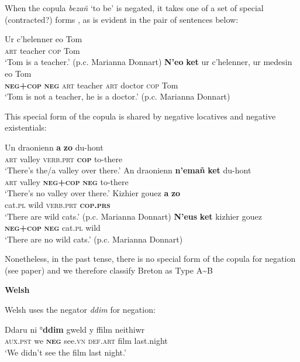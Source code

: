 \documentclass[output=paper]{langsci/langscibook}
\begin{document}
\begin{unindented}
When the copula \textit{bezañ} `to be' \citep[144]{Press1986} is negated, it takes one of a set of special (contracted?) forms \citep[152]{Press1986}, as is evident in the pair of sentences below:
%
\begin{exe}\ex \gll Ur   c’helenner eo    Tom \\
\textsc{art} teacher \textsc{cop} Tom \\
    \glt `Tom is a teacher.' (p.c. Marianna Donnart)
\ex \gll \textbf{N’eo} \textbf{ket} ur c’helenner, ur medesin eo Tom \\
\textbf{\textsc{neg+cop}} \textbf{\textsc{neg}} \textsc{art} teacher        \textsc{art} doctor    \textsc{cop} Tom \\
    \glt `Tom is not a teacher, he is a doctor.' (p.c. Marianna Donnart)
    \end{exe}

This special form of the copula is shared by negative locatives and negative existentials:
%
\begin{exe}\ex \gll Un  draonienn \textbf{a} \textbf{zo}   du-hont \\
\textsc{art} valley \textsc{verb.prt} \textbf{\textsc{cop}} to-there \\
    \glt `There's the/a valley over there.' \citep[154]{Press1986}
\ex \gll
An   draonienn \textbf{n’emañ}     \textbf{ket}  du-hont \\
\textsc{art} valley \textbf{\textsc{neg+cop}} \textbf{\textsc{neg}} to-there \\
    \glt `There's no valley over there.' \citep[155]{Press1986}
\ex \gll Kizhier gouez \textbf{a} \textbf{zo} \\
cat.\textsc{pl}   wild   \textsc{verb.prt} \textbf{\textsc{cop.prs}} \\
    \glt `There are wild cats.' (p.c. Marianna Donnart)
\ex \gll \textbf{N’eus} \textbf{ket}   kizhier gouez \\
\textbf{\textsc{neg+cop}} \textbf{\textsc{neg}} cat.\textsc{pl} wild \\
    \glt `There are no wild cats.' (p.c. Marianna Donnart)
    \end{exe}

Nonetheless, in the past tense, there is no special form of the copula for negation (see paper) and we therefore classify Breton as Type A{\textasciitilde}B

\textbf{Welsh}

Welsh uses the negator \textit{ddim} for negation:
%
\begin{exe}\ex \gll Ddaru ni °\textbf{ddim} gweld y ffilm neithiwr \\
\textsc{aux.pst} we \textbf{\textsc{neg}} see.\textsc{vn} \textsc{def.art} film   last.night \\
    \glt `We didn't see the film last night.' \citep[190]{King2003}
    \end{exe}


\end{unindented}
\end{document}
